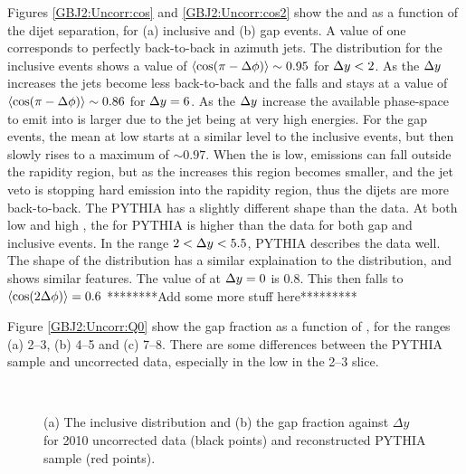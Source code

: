 Figures \ref{GBJ2:Uncorr:cos} and \ref{GBJ2:Uncorr:cos2} show the \mean{\cosdphi{}} and \mean{\costwodphi{}} as a function of the dijet separation, \dy{} for (a) inclusive and (b) gap events.
A \mean{\cosdphi{}} value of one corresponds to perfectly back-to-back in azimuth jets.
The \mean{\cosdphi{}} distribution for the inclusive events shows a value of $ \mbox{$\langle \mbox{$\rm cos(\pi - \mbox{$\Delta{\rm \phi}$}{})$}{} \rangle$}\sim0.95$ for $\mbox{$\Delta y$}{}<2$.
As the $\mbox{$\Delta y$}{}$ increases the jets become less back-to-back and the \mean{\cosdphi{}} falls and stays at a value of $ \mbox{$\langle \mbox{$\rm cos(\pi - \mbox{$\Delta{\rm \phi}$}{})$}{} \rangle$}\sim0.86$ for $\mbox{$\Delta y$}{}=6$.
As the $\mbox{$\Delta y$}{}$ increase the available phase-space to emit into is larger due to the jet being at very high energies.
For the gap events, the mean{\cosdphi{}} at low \dy{} starts at a similar level to the inclusive events, but then slowly rises to a maximum of $\sim 0.97$.
When the \dy{} is low, emissions can fall outside the rapidity region, but as the \dy{} increases this region becomes smaller, and the jet veto is stopping hard emission into the rapidity region, thus the dijets are more back-to-back.
The PYTHIA has a slightly different shape than the data.
At both low and high \dy{}, the \mean{\cosdPhi{}} for PYTHIA is higher than the data for both gap and inclusive events. 
In the range $2<\mbox{$\Delta y$}{}<5.5$, PYTHIA describes the data well.
The shape of the \mean{\costwodphi{}} distribution has a similar explaination to the \mean{\cosdphi{}} distribution, and shows similar features.
The value of \mean{\costwodphi{}} at $\mbox{$\Delta y$}{}=0$ is 0.8.
This then falls to $\mbox{$\langle \mbox{$\rm cos(2\mbox{$\Delta{\rm \phi}$}{}) $}{} \rangle$}=0.6$
********Add some more stuff here*********

Figure \ref{GBJ2:Uncorr:Q0} show the gap fraction as a function of \qz{}, for the \dy{} ranges (a) 2--3, (b) 4--5 and (c) 7--8.
There are some differences between the PYTHIA sample and uncorrected data, especially in the low \qz{} in the 2--3 \dy{} slice.


\begin{figure}
\centering
\mbox{
              \quad
              \quad
                              }
\caption[]{
(a) The inclusive distribution and (b) the gap fraction against $\Delta y$ for 2010 uncorrected data (black points) and reconstructed PYTHIA sample (red points).
\label{GBJ2:Uncorr:Incl_Gap}}
\end{figure}



